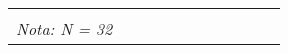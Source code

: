 \begin{sidewaystable}[ph!]
\begin{tabular}{lcccccccccc}
		\bottomrule
		\textbf{} & & & & & & & & & &  \\
		\textit{Nota: N = 32} & & & & & & & & & &  \\
		


 
 


\end{tabular}
\label{tab:tipitipi}
\end{sidewaystable}

